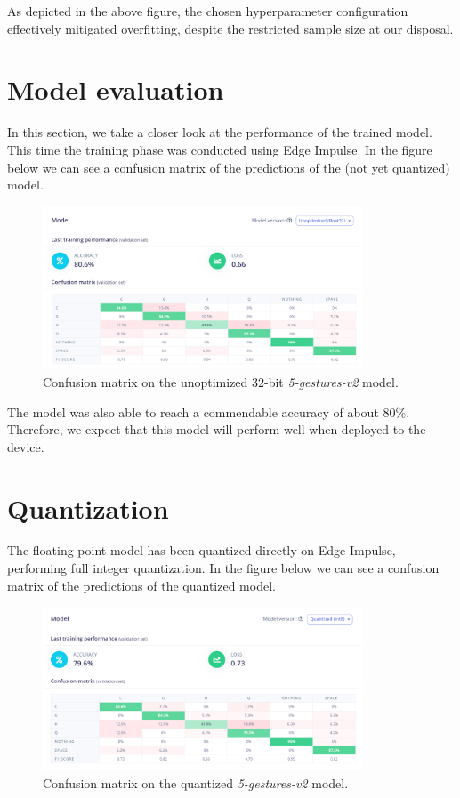 \documentclass{Configuration_Files/PoliMi3i_thesis}
\begin{document}
As depicted in the above figure, the chosen hyperparameter configuration effectively mitigated overfitting, despite the restricted sample size at our disposal.


\section{Model evaluation}
\label{sec:5-v2-evaluation}
In this section, we take a closer look at the performance of the trained model. This time the training phase was conducted using Edge Impulse. In the figure below we can see a confusion matrix of the predictions of the (not yet quantized) model.

\begin{figure}[H]
   \centering
   \includegraphics[width=0.85\textwidth]{Figures/5-gestures-v2/ei_v2_unoptimized.png}
   \caption{Confusion matrix on the unoptimized 32-bit \textit{5-gestures-v2} model.}
   \label{fig:5_v2_cmatrix_unoptim}
\end{figure}

The model was also able to reach a commendable accuracy of about $80$\%. Therefore, we expect that this model will perform well when deployed to the device.


\section{Quantization}
\label{sec:5-v2-quant}
The floating point model has been quantized directly on Edge Impulse, performing full integer quantization. In the figure below we can see a confusion matrix of the predictions of the quantized model.

\begin{figure}[H]
   \centering
   \includegraphics[width=0.85\textwidth]{Figures/5-gestures-v2/ei_v2_quant.png}
   \caption{Confusion matrix on the quantized \textit{5-gestures-v2} model.}
   \label{fig:5_v2_cmatrix_quant}
\end{figure}
\end{document}
